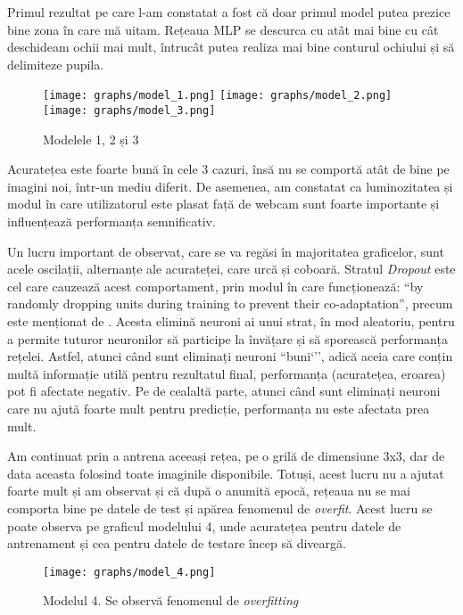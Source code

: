 Primul rezultat pe care l-am constatat a fost că doar primul model putea prezice bine zona în care mă uitam.
Rețeaua MLP se descurca cu atât mai bine cu cât deschideam ochii mai mult, întrucât putea realiza mai bine conturul ochiului și să delimiteze pupila.

\begin{figure}[H]
    \centering
    \texttt{[image: graphs/model\_1.png]}
    \texttt{[image: graphs/model\_2.png]}
    \texttt{[image: graphs/model\_3.png]}
    \caption{Modelele 1, 2 și 3}
\end{figure}

Acuratețea este foarte bună în cele 3 cazuri, însă nu se comportă atât de bine pe imagini noi, într-un mediu diferit.
De asemenea, am constatat ca luminozitatea și modul în care utilizatorul este plasat față de webcam sunt foarte importante și influențează performanța semnificativ.

Un lucru important de observat, care se va regăsi în majoritatea graficelor, sunt acele oscilații, alternanțe ale acurateței, care urcă și coboară.
Stratul \emph{Dropout} este cel care cauzează acest comportament, prin modul în care funcționează: ``by randomly dropping units during training to prevent their co-adaptation'', precum este menționat de \cite{dropout_algorithm}.
Acesta elimină neuroni ai unui strat, în mod aleatoriu, pentru a permite tuturor neuronilor să participe la învățare și să sporească performanța rețelei.
Astfel, atunci când sunt eliminați neuroni ``buni`'', adică aceia care conțin multă informație utilă pentru rezultatul final, performanța (acuratețea, eroarea) pot fi afectate negativ.
Pe de cealaltă parte, atunci când sunt eliminați neuroni care nu ajută foarte mult pentru predicție, performanța nu este afectata prea mult.

Am continuat prin a antrena aceeași rețea, pe o grilă de dimensiune 3x3, dar de data aceasta folosind toate imaginile disponibile.
Totuși, acest lucru nu a ajutat foarte mult și am observat și că după o anumită epocă, rețeaua nu se mai comporta bine pe datele de test și apărea fenomenul de \emph{overfit}.
Acest lucru se poate observa pe graficul modelului 4, unde acuratețea pentru datele de antrenament și cea pentru datele de testare încep să diveargă.

\begin{figure}[h]
    \centering
    \texttt{[image: graphs/model\_4.png]}
    \caption{Modelul 4. Se observă fenomenul de \emph{overfitting}}
\end{figure}

